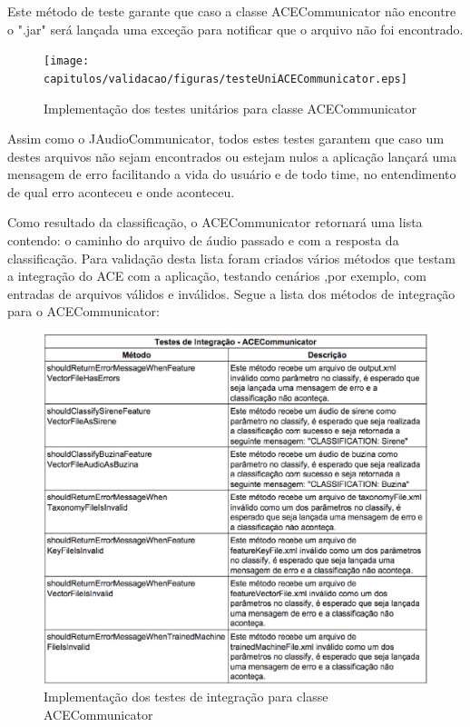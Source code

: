 \begin{itemize}
Este método de teste garante que caso a classe ACECommunicator não encontre o ".jar" será lançada uma exceção para notificar que o arquivo não foi encontrado.

\begin{figure}[H]
	\centering
	\captionsetup{justification=centering,margin=2cm}
	\texttt{[image: capitulos/validacao/figuras/testeUniACECommunicator.eps]}
	\caption{Implementação dos testes unitários para classe ACECommunicator}
	\label{fig:result-engajamento}
\end{figure}

Assim como o JAudioCommunicator, todos estes testes garantem que caso um destes arquivos não sejam encontrados ou estejam nulos a aplicação lançará uma mensagem de erro facilitando a vida do usuário e de todo time, no entendimento de qual erro aconteceu e onde aconteceu.

Como resultado da classificação, o ACECommunicator retornará uma lista contendo: o caminho do arquivo de áudio passado e com a resposta da classificação. Para validação desta lista foram criados vários métodos que testam a integração do ACE com a aplicação, testando cenários ,por exemplo, com entradas de arquivos válidos e inválidos. Segue a lista dos métodos de integração para o ACECommunicator:

\begin{figure}[H]
	\centering
	\captionsetup{justification=centering,margin=2cm}
	\includegraphics[scale=0.65]{capitulos/validacao/figuras/testesIntegracaoACECommunicator.eps}
	\caption{Implementação dos testes de integração para classe ACECommunicator}
	\label{fig:result-engajamento}
\end{figure}


\end{itemize}
